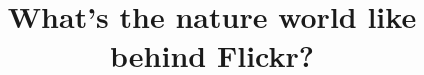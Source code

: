 \documentclass{sig-alternate-05-2015}
\begin{document}


\title{What's the nature world like behind Flickr?}

%
%
%
%
%
\end{document}
